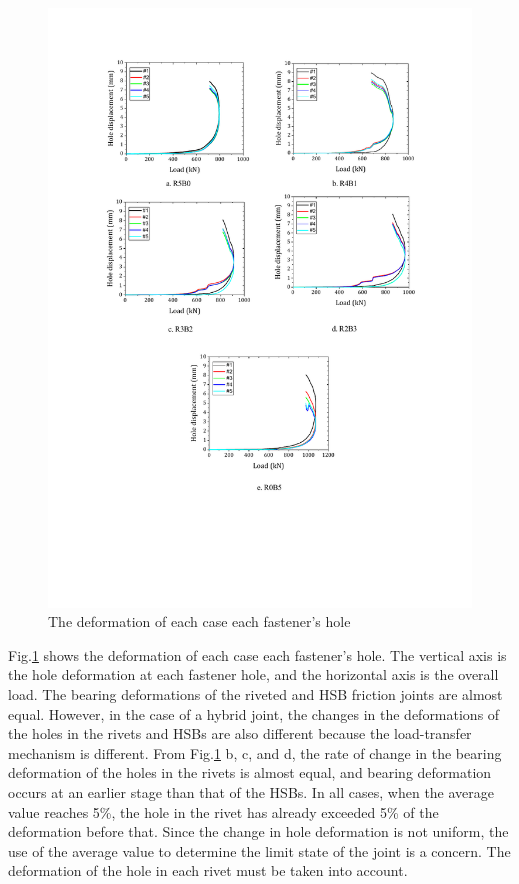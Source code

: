 \begin{figure}[htbp]
    \centering
    \includegraphics[width=1\linewidth]{imgs//ch4/fig-5rholedef.pdf}
    \caption{The deformation of each case each fastener's hole}
    \label{fig-5rholedef}
\end{figure}

Fig.\ref{fig-5rholedef} shows the deformation of each case each fastener's hole. The vertical axis is the hole deformation at each fastener hole, and the horizontal axis is the overall load. The bearing deformations of the riveted and \ac{HSB} friction joints are almost equal. However, in the case of a hybrid joint, the changes in the deformations of the holes in the rivets and \ac{HSB}s are also different because the load-transfer mechanism is different. From Fig.\ref{fig-5rholedef} b, c, and d, the rate of change in the bearing deformation of the holes in the rivets is almost equal, and bearing deformation occurs at an earlier stage than that of the \ac{HSB}s. In all cases, when the average value reaches 5\%, the hole in the rivet has already exceeded 5\% of the deformation before that. Since the change in hole deformation is not uniform, the use of the average value to determine the limit state of the joint is a concern. The deformation of the hole in each rivet must be taken into account.



